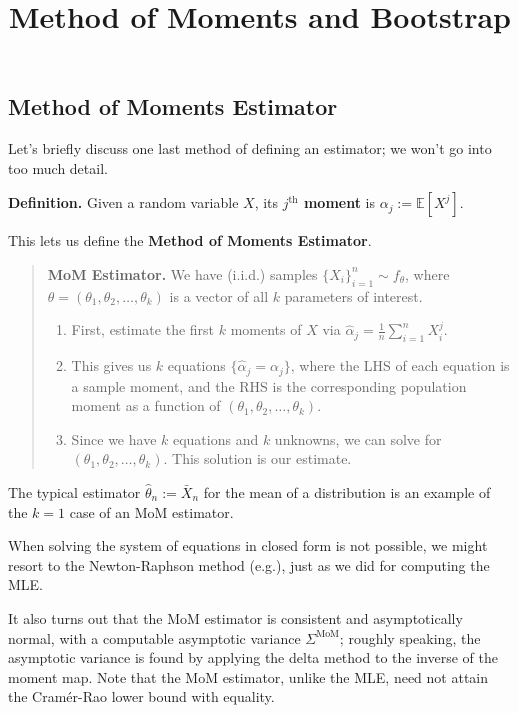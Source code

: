 \title{Method of Moments and Bootstrap}



\subsection{Method of Moments Estimator}

Let's briefly discuss one last method of defining an estimator;
we won't go into too much detail.

\textbf{Definition.} Given a random variable $X$,
its \textbf{$j^{\text{th}}$ moment} is $\alpha_j := \mathbb{E}[X^j]$.

This lets us define the \textbf{Method of Moments Estimator}.

\begin{quote}
    \textbf{MoM Estimator.}
    We have (i.i.d.) samples $\{X_i\}_{i = 1}^n \sim f_{\theta}$,
    where $\theta = (\theta_1, \theta_2, \dots, \theta_k)$
    is a vector of all $k$ parameters of interest.
    \begin{enumerate}
        \item First, estimate the first $k$ moments of $X$ via
        $\hat{\alpha}_j = \frac{1}{n} \sum_{i = 1}^n X_i^j$.
        \item This gives us $k$ equations $\{\hat{\alpha}_j = \alpha_j\}$,
        where the LHS of each equation is a sample moment,
        and the RHS is the corresponding population moment as a function of
        $(\theta_1, \theta_2, \dots, \theta_k)$.
        \item Since we have $k$ equations and $k$ unknowns,
        we can solve for $(\theta_1, \theta_2, \dots, \theta_k)$.
        This solution is our estimate.
    \end{enumerate}
\end{quote}

\begin{remark}
    The typical estimator $\hat{\theta}_n := \bar{X}_n$ for the mean of a distribution
    is an example of the $k = 1$ case of an MoM estimator.
\end{remark}

When solving the system of equations in closed form is not possible,
we might resort to the Newton-Raphson method (e.g.),
just as we did for computing the MLE.

It also turns out that the MoM estimator is consistent and asymptotically normal,
with a computable asymptotic variance $\Sigma^{\mathrm{MoM}}$;
roughly speaking, the asymptotic variance is found by applying the delta method
to the inverse of the moment map.
Note that the MoM estimator, unlike the MLE,
need not attain the Cramér-Rao lower bound with equality.

